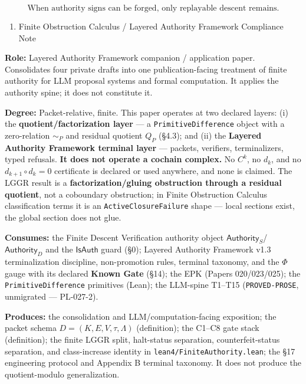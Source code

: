 \documentclass[
  10pt,
]{article}
\providecommand{\tightlist}{%
  \setlength{\itemsep}{0pt}\setlength{\parskip}{0pt}}
\providecommand{\tightlist}{%
  \setlength{\itemsep}{0pt}\setlength{\parskip}{0pt}}
\DeclareRobustCommand{\texttt}[1]{{\paperSymbolFont\nolinkurl{#1}}}
\begin{document}
\protect\hypertarget{math-E0172-0233}{}{\[
\boxed{
\text{When authority signs can be forged, only replayable descent remains.}
}
\]}

\begin{enumerate}
\def\labelenumi{\arabic{enumi}.}
\setcounter{enumi}{21}
\tightlist
\item
  Finite Obstruction Calculus / Layered Authority Framework Compliance Note
\end{enumerate}

\textbf{Role:} Layered Authority Framework companion / application paper. Consolidates four private drafts into one publication-facing treatment of finite authority for LLM proposal systems and formal computation. It applies the authority spine; it does not constitute it.

\textbf{Degree:} Packet-relative, finite. This paper operates at two declared layers: (i) the \textbf{quotient/factorization layer} --- a \texttt{PrimitiveDifference} object with a zero-relation \protect\hypertarget{math-E0173-0234}{}{\(\sim_P\)} and residual quotient \protect\hypertarget{math-E0050-0235}{}{\(Q_P\)} (§4.3); and (ii) the \textbf{Layered Authority Framework terminal layer} --- packets, verifiers, terminalizers, typed refusals. \textbf{It does not operate a cochain complex.} No \protect\hypertarget{math-E0174-0236}{}{\(C^k\)}, no \protect\hypertarget{math-E0175-0237}{}{\(d_k\)}, and no \protect\hypertarget{math-E0176-0238}{}{\(d_{k+1}\circ d_k=0\)} certificate is declared or used anywhere, and none is claimed. The LGGR result is a \textbf{factorization/gluing obstruction through a residual quotient}, not a coboundary obstruction; in Finite Obstruction Calculus classification terms it is an \texttt{ActiveClosureFailure} shape --- local sections exist, the global section does not glue.

\textbf{Consumes:} the Finite Descent Verification authority object \protect\hypertarget{math-E0177-0239}{}{\(\mathsf{Authority}_S\)}/\protect\hypertarget{math-E0010-0240}{}{\(\mathsf{Authority}_D\)} and the \protect\hypertarget{math-E0004-0241}{}{\(\mathsf{IsAuth}\)} guard (§0); Layered Authority Framework v1.3 terminalization discipline, non-promotion rules, terminal taxonomy, and the \protect\hypertarget{math-E0005-0242}{}{\(\Phi\)} gauge with its declared \textbf{Known Gate} (§14); the EPK (Papers 020/023/025); the \texttt{PrimitiveDifference} primitives (Lean); the LLM-spine T1--T15 (\texttt{PROVED-PROSE}, unmigrated --- PL-027-2).

\textbf{Produces:} the consolidation and LLM/computation-facing exposition; the packet schema \protect\hypertarget{math-E0178-0243}{}{\(D=(K,E,V,\tau,\Lambda)\)} (definition); the C1--C8 gate stack (definition); the finite LGGR split, halt-status separation, counterfeit-status separation, and class-increase identity in \texttt{lean4/FiniteAuthority.lean}; the §17 engineering protocol and Appendix B terminal taxonomy. It does not produce the quotient-modulo generalization.
\end{document}
